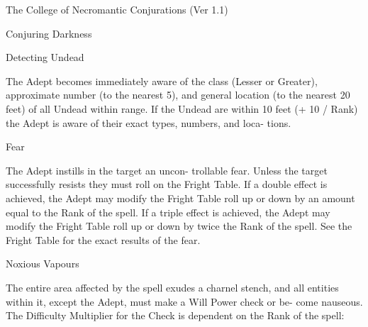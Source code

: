 \begin{Chapter}{The College of Necromantic Conjurations (Ver 1.1)}
\begin{spell}[G-3]{Conjuring Darkness}
\begin{effects}
\end{effects}
\end{spell}

\begin{spell}[G-4]{Detecting Undead}

\begin{effects}
The Adept becomes immediately aware of 
the  class (Lesser  or  Greater),  approximate  number 
(to  the  nearest  5),  and  general  location  (to  the 
nearest  20  feet)  of  all  Undead  within  range.  If  the 
Undead are within 10 feet (+ 10 / Rank) the Adept 
is  aware  of  their  exact  types,  numbers,  and  loca-
tions. 

\end{effects}
\end{spell}

\begin{spell}[G-5]{Fear}

\begin{effects}
 The  Adept  instills  in  the  target  an  uncon-
trollable fear. Unless the target successfully resists 
they  must  roll  on  the  Fright  Table.  If  a  double 
effect  is  achieved,  the  Adept  may  modify  the 
Fright Table roll up or down by an amount equal to 
the Rank of the spell. If a triple effect is achieved, 
the  Adept  may  modify  the  Fright  Table  roll  up  or 
down by twice the Rank of the spell. See the Fright 
Table for the exact results of the fear. 

\end{effects}
\end{spell}

\begin{spell}[G-6]{Noxious Vapours}

\begin{effects}
The entire area affected by the spell exudes 
a  charnel  stench,  and  all  entities  within  it,  except 
the  Adept,  must  make  a  Will  Power  check  or  be-
come  nauseous.  The  Difficulty  Multiplier  for  the 
Check is dependent on the Rank of the spell: 


\end{effects}
\end{spell}
\end{Chapter}
